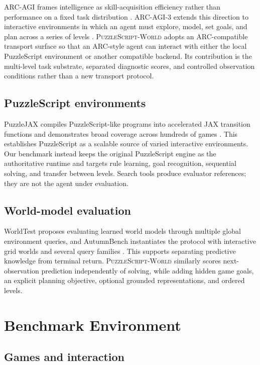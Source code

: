 \documentclass[sigconf,nonacm]{acmart}
\newcommand{\benchmarkname}{\textsc{PuzzleScript-World}}
\begin{document}
ARC-AGI frames intelligence as skill-acquisition efficiency rather than
performance on a fixed task distribution \cite{chollet2019measure}. ARC-AGI-3
extends this direction to interactive environments in which an agent must
explore, model, set goals, and plan across a series of levels
\cite{arcprize2026arcagi3}. \benchmarkname{} adopts an ARC-compatible transport
surface so that an ARC-style agent can interact with either the local
PuzzleScript environment or another compatible backend. Its contribution is
the multi-level task substrate, separated diagnostic scores, and controlled
observation conditions rather than a new transport protocol.

\subsection{PuzzleScript environments}

PuzzleJAX compiles PuzzleScript-like programs into accelerated JAX transition
functions and demonstrates broad coverage across hundreds of games
\cite{earle2025puzzlejax}. This establishes PuzzleScript as a scalable source of
varied interactive environments. Our benchmark instead keeps the original
PuzzleScript engine as the authoritative runtime and targets rule learning,
goal recognition, sequential solving, and transfer between levels. Search
tools produce evaluator references; they are not the agent under evaluation.

\subsection{World-model evaluation}

WorldTest proposes evaluating learned world models through multiple global
environment queries, and AutumnBench instantiates the protocol with interactive
grid worlds and several query families \cite{warrier2026worldtest}. This
supports separating predictive knowledge from terminal return.
\benchmarkname{} similarly scores next-observation prediction independently of
solving, while adding hidden game goals, an explicit planning objective,
optional grounded representations, and ordered levels.

\section{Benchmark Environment}

\subsection{Games and interaction}
\end{document}
